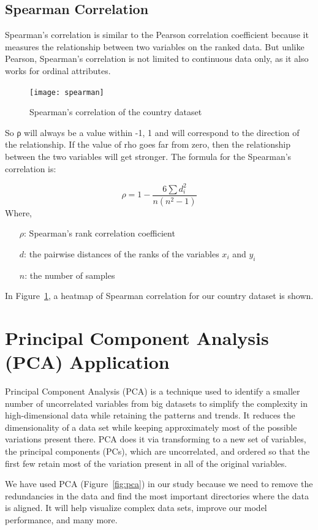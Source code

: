\documentclass{swfuthesise}
\begin{document}
\subsection{Spearman Correlation}

Spearman’s correlation is similar to the Pearson correlation coefficient because it measures the relationship between two variables on the ranked data. But unlike Pearson, Spearman's correlation is not limited to continuous data only, as it also works for ordinal attributes.

\begin{figure}[htp]
    \centering
    \texttt{[image: spearman]}
    \caption{Spearman's correlation of the country dataset}
    \label{fig:spearman}
\end{figure}

So ρ will always be a value within -1, 1 and will correspond to the direction of the relationship. If the value of rho goes far from zero, then the relationship between the two variables will get stronger. The formula for the Spearman's correlation is:

\[
  \rho = 1- {\frac {6 \sum d_i^2}{n(n^2 - 1)}}
\]
Where,
\begin{itemize}[itemsep=-1.5ex]
\item[\(\rho\):] Spearman's rank correlation coefficient
\item[\(d\):] the pairwise distances of the ranks of the variables \(x_i\) and \(y_i\)
\item[\(n\):] the number of samples
\end{itemize}
In Figure~\ref{fig:spearman}, a heatmap of Spearman correlation for our country dataset is shown.
\section{Principal Component Analysis (PCA) Application}

Principal Component Analysis (PCA) is a technique used to identify a smaller number of
uncorrelated variables from big datasets to simplify the complexity in high-dimensional
data while retaining the patterns and trends.  It reduces the dimensionality of a data set
while keeping approximately most of the possible variations present there. PCA does it via
transforming to a new set of variables, the principal components (PCs), which are
uncorrelated, and ordered so that the first few retain most of the variation present in
all of the original variables.

We have used PCA (Figure~\ref{fig:pca}) in our study because we need to remove the redundancies in the data and
find the most important directories where the data is aligned. It will help visualize
complex data sets, improve our model performance, and many more.
\end{document}
